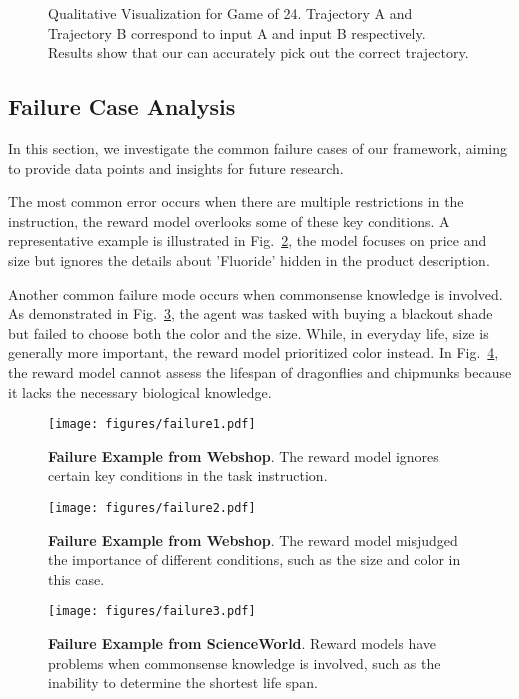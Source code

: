 \begin{figure}[!htp]
    \centering
    \vspace{-8pt}
    \caption{
    Qualitative Visualization for Game of 24. Trajectory A and Trajectory B correspond to input A and input B respectively. Results show that our \Model  can accurately pick out the correct trajectory.
    }
    \label{fig:qualitative_vis_game24}
\end{figure}


\subsection{Failure Case Analysis}
\label{sec:failure}
In this section, we investigate the common failure cases of our framework, aiming to provide data points and insights for future research.

The most common error occurs when there are multiple restrictions in the instruction, the reward model overlooks some of these key conditions. A representative example is illustrated in Fig.~\ref{fig:failure_webshop1}, the model focuses on price and size but ignores the details about 'Fluoride' hidden in the product description.


Another common failure mode occurs when commonsense knowledge is involved. As demonstrated in Fig.~\ref{fig:failure_webshop2}, the agent was tasked with buying a blackout shade but failed to choose both the color and the size. While, in everyday life, size is generally more important, the reward model prioritized color instead.
In Fig.~\ref{fig:failure_science1}, the reward model cannot assess the lifespan of dragonflies and chipmunks because it lacks the necessary biological knowledge.
\begin{figure}[!htp]
    \centering
    \texttt{[image: figures/failure1.pdf]}  
    \caption{
    \textbf{Failure Example from Webshop}. The reward model ignores certain key conditions in the task instruction.
    }
    \label{fig:failure_webshop1}
\end{figure}
\begin{figure}[!htp]
    \centering
    \texttt{[image: figures/failure2.pdf]}  
    \caption{
    \textbf{Failure Example from Webshop}. The reward model misjudged the importance of different conditions, such as the size and color in this case. 
    }
    \label{fig:failure_webshop2}
\end{figure}
\begin{figure}[!htp]
    \centering
    \texttt{[image: figures/failure3.pdf]}  
    \caption{
    \textbf{Failure Example from ScienceWorld}. Reward models have problems when commonsense knowledge is involved, such as the inability to determine the shortest life span.
    }
    \label{fig:failure_science1}
\end{figure}


